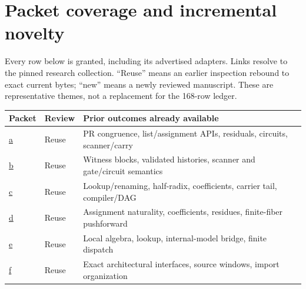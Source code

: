 \section{Packet coverage and incremental novelty}

Every row below is granted, including its advertised adapters. Links resolve to the pinned research collection. ``Reuse'' means an earlier inspection rebound to exact current bytes; ``new'' means a newly reviewed manuscript. These are representative themes, not a replacement for the 168-row ledger.

{\small
\begin{tabularx}{\linewidth}{@{}L{0.48in}L{0.48in}Y@{}}
\toprule
Packet & Review & Prior outcomes already available \\
\midrule
\href{https://github.com/VladimirReshetnikov/ProveIt/tree/e652d21c413de59e4821f6e8e9b6a3a077bf5bfe/Computability/DiophantineConsistency/research/lean-proof-simplification/2026-10-26a}{a} & Reuse & PR congruence, list/assignment APIs, residuals, circuits, scanner/carry \\
\href{https://github.com/VladimirReshetnikov/ProveIt/tree/e652d21c413de59e4821f6e8e9b6a3a077bf5bfe/Computability/DiophantineConsistency/research/lean-proof-simplification/2026-10-26b}{b} & Reuse & Witness blocks, validated histories, scanner and gate/circuit semantics \\
\href{https://github.com/VladimirReshetnikov/ProveIt/tree/e652d21c413de59e4821f6e8e9b6a3a077bf5bfe/Computability/DiophantineConsistency/research/lean-proof-simplification/2026-10-26c}{c} & Reuse & Lookup/renaming, half-radix, coefficients, carrier tail, compiler/DAG \\
\href{https://github.com/VladimirReshetnikov/ProveIt/tree/e652d21c413de59e4821f6e8e9b6a3a077bf5bfe/Computability/DiophantineConsistency/research/lean-proof-simplification/2026-10-26d}{d} & Reuse & Assignment naturality, coefficients, residues, finite-fiber pushforward \\
\href{https://github.com/VladimirReshetnikov/ProveIt/tree/e652d21c413de59e4821f6e8e9b6a3a077bf5bfe/Computability/DiophantineConsistency/research/lean-proof-simplification/2026-10-26e}{e} & Reuse & Local algebra, lookup, internal-model bridge, finite dispatch \\
\href{https://github.com/VladimirReshetnikov/ProveIt/tree/e652d21c413de59e4821f6e8e9b6a3a077bf5bfe/Computability/DiophantineConsistency/research/lean-proof-simplification/2026-10-26f}{f} & Reuse & Exact architectural interfaces, source windows, import organization \\

\end{tabularx}}
